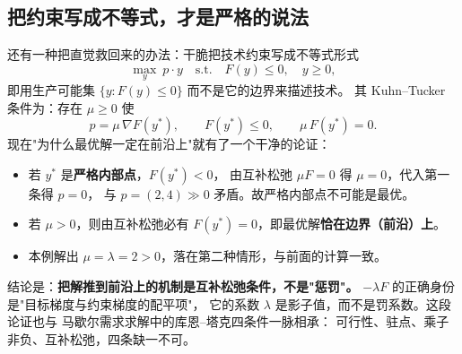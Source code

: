 \subsection{把约束写成不等式，才是严格的说法}

还有一种把直觉救回来的办法：干脆把技术约束写成不等式形式
\begin{equation}
\max_{y}\ p\cdot y
\quad\text{s.t.}\quad F(y)\le 0,\quad y\ge 0,
\label{eq:inequality-form}
\end{equation}
即用生产可能集 $\{y:F(y)\le 0\}$ 而不是它的边界来描述技术。
其 Kuhn--Tucker 条件为：存在 $\mu\ge 0$ 使
\begin{equation}
p=\mu\,\nabla F(y^{*}),\qquad
F(y^{*})\le 0,\qquad
\mu\,F(y^{*})=0.
\label{eq:kt}
\end{equation}
现在"为什么最优解一定在前沿上"就有了一个干净的论证：

\begin{itemize}
  \item 若 $y^{*}$ 是\textbf{严格内部点}，$F(y^{*})<0$，
        由互补松弛 $\mu F=0$ 得 $\mu=0$，代入第一条得 $p=0$，
        与 $p=(2,4)\gg 0$ 矛盾。故严格内部点不可能是最优。
  \item 若 $\mu>0$，则由互补松弛必有 $F(y^{*})=0$，即最优解\textbf{恰在边界（前沿）上}。
  \item 本例解出 $\mu=\lambda=2>0$，落在第二种情形，与前面的计算一致。
\end{itemize}

结论是：\textbf{把解推到前沿上的机制是互补松弛条件，不是"惩罚"。}
 $-\lambda F$ 的正确身份是"目标梯度与约束梯度的配平项"，
它的系数 $\lambda$ 是影子值，而不是罚系数。这段论证也与
马歇尔需求求解中的库恩--塔克四条件一脉相承：
可行性、驻点、乘子非负、互补松弛，四条缺一不可。
